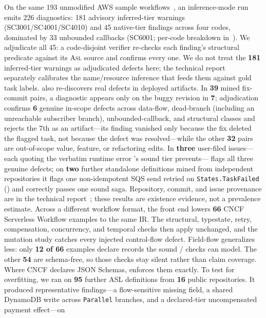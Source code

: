 On the same 193 unmodified AWS sample workflows~\cite{awsServerlessPatterns}, an
inference-mode run emits 226 diagnostics: 181 advisory inferred-tier
warnings (SC3001/SC4001/SC4010) and 45 native-tier findings across
four codes, dominated by 33 unbounded callbacks (SC6001; per-code
breakdown in~\cite{stepcheck-repo}). We adjudicate all 45: a
code-disjoint verifier re-checks each finding's structural predicate
against its \textsc{Asl} source and confirms every one.
We do not treat the \textbf{181} inferred-tier warnings as
adjudicated defects here; the technical report~\cite{stepcheck-repo} separately calibrates the
name/resource inference that feeds them against gold task labels.
\tool{} also re-discovers real defects in deployed artifacts. In \textbf{39} mined fix-commit pairs,
a diagnostic appears only on the buggy revision in \textbf{7}; adjudication confirms \textbf{6}
genuine in-scope defects across data-flow, dead-branch (including an 
unreachable subscriber branch), unbounded-callback, and structural classes
and rejects the 7th as an artifact---its finding vanished only because the fix deleted the flagged
task, not because the defect was resolved---while the other \textbf{32} pairs are out-of-scope
value, feature, or refactoring edits. In \textbf{three} user-filed issues---each quoting the verbatim
runtime error \tool{}'s sound tier prevents---\tool{} flags all three genuine  defects;
on \textbf{two} further standalone definitions mined from independent repositories it flags one
non-idempotent SQS send retried on \texttt{States.TaskFailed} () and correctly passes one
sound saga. Repository, commit, and issue
provenance are in the technical report~\cite{stepcheck-repo}; these results are existence evidence,
not a prevalence estimate.
Across a different workflow format, the front end lowers \textbf{66} CNCF Serverless Workflow examples
to the same IR. The structural, typestate, retry, compensation, concurrency, and temporal checks then
apply unchanged, and the mutation study catches every injected control-flow defect. Field-flow
generalizes less: only \textbf{12 of 66} examples declare records the sound /
checks can model. The other \textbf{54} are schema-free, so those checks stay silent rather than claim
coverage. Where CNCF declares JSON Schemas,  enforces them exactly.
To test for overfitting, we ran \tool{} on \textbf{95} further ASL definitions from \textbf{16} public
repositories. It produced representative findings---a flow-sensitive missing field, a shared
DynamoDB write across \texttt{Parallel} branches, and a declared-tier uncompensated payment effect---on
